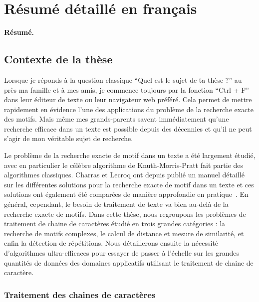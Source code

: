 \chapter*{Résumé détaillé en français}\setcounter{page}{1}

\textbf{Résumé.}
\newpage

\section*{Contexte de la thèse}

Lorsque je réponds à la question classique ``Quel est le sujet de ta thèse ?'' au près ma famille et à mes amis, je commence toujours par la fonction ``Ctrl + F'' dans leur éditeur de texte ou leur navigateur web préféré. Cela permet de mettre rapidement en évidence l'une des applications du problème de la recherche exacte des motifs.
Mais même mes grands-parents savent immédiatement qu'une recherche efficace dans un texte est possible depuis des décennies et qu'il ne peut s'agir de mon véritable sujet de recherche.

Le problème de la recherche exacte de motif dans un texte a été largement étudié, avec en particulier le célèbre algorithme de Knuth-Morris-Pratt fait partie des algorithmes classiques. Charras et Lecroq ont depuis publié un manuel détaillé~\cite{Charras2004} sur les différentes solutions pour la recherche exacte de motif dans un texte et ces solutions ont également été comparées de manière approfondie en pratique~\cite{DBLP:journals/corr/abs-1012-2547, faro2013exact}. En général, cependant, le besoin de traitement de texte va bien au-delà de la recherche exacte de motifs. Dans cette thèse, nous regroupons les problèmes de traitement de chaine de caractères étudié en trois grandes catégories : la recherche de motifs complexes, le calcul de distance et mesure de similarité, et enfin la détection de répétitions. Nous détaillerons ensuite la nécessité d'algorithmes ultra-efficaces pour essayer de passer à l'échelle sur les grandes quantités de données des domaines applicatifs utilisant le traitement de chaine de caractère.

\subsection*{Traitement des chaines de caractères}

